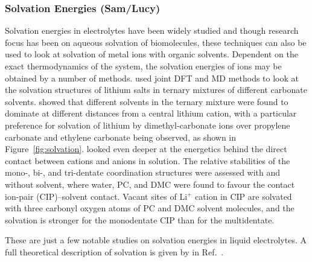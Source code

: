 \documentclass[../main.tex]{subfiles}
\begin{document}
\subsubsection{Solvation Energies (Sam/Lucy)}
Solvation energies in electrolytes have been widely studied and though research focus has been on aqueous solvation of biomolecules, these techniques can also be used to look at solvation of metal ions with organic solvents. Dependent on the exact thermodynamics of the system, the solvation energies of ions may be obtained by a number of methods. \citeauthor{Skarmoutsos_2015} used joint DFT and MD methods to look at the solvation structures of lithium salts in ternary mixtures of different carbonate solvents. \cite{Skarmoutsos_2015} \citeauthor{Skarmoutsos_2015} showed that different solvents in the ternary mixture were found to dominate at different distances from a central lithium cation, with a particular preference for solvation of lithium by dimethyl-carbonate ions over propylene carbonate and ethylene carbonate being observed, as shown in Figure~\ref{fig:solvation}. \citeauthor{Takeuchi_2012} looked even deeper at the energetics behind the direct contact between cations and anions in solution\cite{Takeuchi_2012}. The relative stabilities of the mono-, bi-, and tri-dentate coordination structures were assessed with and without solvent, where water, PC, and DMC were found to favour the contact ion-pair (CIP)–solvent contact. Vacant sites of Li$^+$ cation in CIP are solvated with three carbonyl oxygen atoms of PC and DMC solvent molecules, and the solvation is stronger for the monodentate CIP than for the multidentate. \cite{Takeuchi_2012}

These are just a few notable studies on solvation energies in liquid electrolytes. A full theoretical description of solvation is given by \citeauthor{Lazaridis_1998} in Ref.~.
\end{document}
